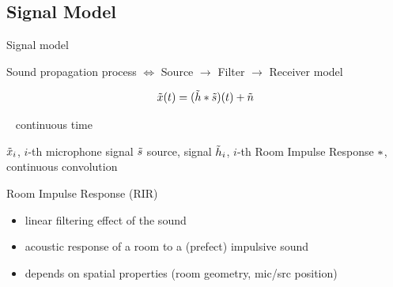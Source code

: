 \subsection{Signal Model}

\begin{frame}[t]{Signal model}

    Sound propagation process $\Leftrightarrow$ Source $\to$ Filter $\to$ Receiver model

    \begin{equation*}
        \tilde{x}(t) = (\tilde{h} \ast \tilde{s})(t) + \tilde{n}
    \end{equation*}

    \begin{center}
        \textcolor{myred}{\small\faExclamationTriangle~ continuous time}
    \end{center}

    $\tilde{x}_i$, $i$-th microphone signal $\tilde{s}$ source, signal $\tilde{h}_i$, $i$-th Room Impulse Response $\ast$, continuous convolution


    \begin{mydefblock}{Room Impulse Response (RIR)}
        \begin{itemize}
            \item linear filtering effect of the sound
            \item acoustic response of a room to a (prefect) impulsive sound
            \item depends on spatial properties (room geometry, mic/src position)
        \end{itemize}
    \end{mydefblock}


\end{frame}
